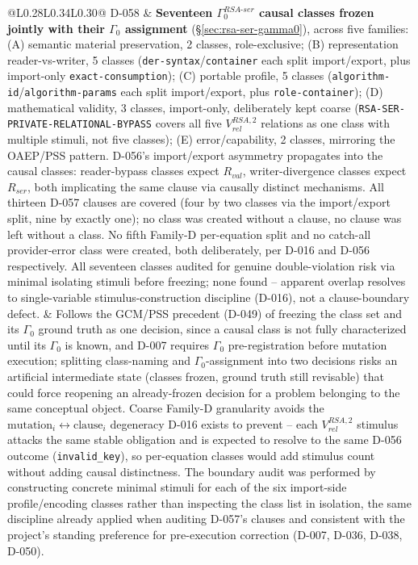 \documentclass[11pt,a4paper]{article}
\begin{document}
\begin{longtable}{@{}L{0.28\textwidth}L{0.34\textwidth}L{0.30\textwidth}@{}}
D-058 & \textbf{Seventeen $\Gamma_0^{RSA\text{-}ser}$ causal classes frozen jointly with their $\Gamma_0$ assignment} (\S\ref{sec:rsa-ser-gamma0}), across five families: (A) semantic material preservation, 2 classes, role-exclusive; (B) representation reader-vs-writer, 5 classes (\texttt{der-syntax}/\texttt{container} each split import/export, plus import-only \texttt{exact-consumption}); (C) portable profile, 5 classes (\texttt{algorithm-id}/\texttt{algorithm-params} each split import/export, plus \texttt{role-container}); (D) mathematical validity, 3 classes, import-only, deliberately kept coarse (\texttt{RSA-SER-PRIVATE-RELATIONAL-BYPASS} covers all five $V_{rel}^{RSA,2}$ relations as one class with multiple stimuli, not five classes); (E) error/capability, 2 classes, mirroring the OAEP/PSS pattern. D-056's import/export asymmetry propagates into the causal classes: reader-bypass classes expect $R_{val}$, writer-divergence classes expect $R_{ser}$, both implicating the same clause via causally distinct mechanisms. All thirteen D-057 clauses are covered (four by two classes via the import/export split, nine by exactly one); no class was created without a clause, no clause was left without a class. No fifth Family-D per-equation split and no catch-all provider-error class were created, both deliberately, per D-016 and D-056 respectively. All seventeen classes audited for genuine double-violation risk via minimal isolating stimuli before freezing; none found -- apparent overlap resolves to single-variable stimulus-construction discipline (D-016), not a clause-boundary defect. & Follows the GCM/PSS precedent (D-049) of freezing the class set and its $\Gamma_0$ ground truth as one decision, since a causal class is not fully characterized until its $\Gamma_0$ is known, and D-007 requires $\Gamma_0$ pre-registration before mutation execution; splitting class-naming and $\Gamma_0$-assignment into two decisions risks an artificial intermediate state (classes frozen, ground truth still revisable) that could force reopening an already-frozen decision for a problem belonging to the same conceptual object. Coarse Family-D granularity avoids the $\text{mutation}_i \leftrightarrow \text{clause}_i$ degeneracy D-016 exists to prevent -- each $V_{rel}^{RSA,2}$ stimulus attacks the same stable obligation and is expected to resolve to the same D-056 outcome (\texttt{invalid\_key}), so per-equation classes would add stimulus count without adding causal distinctness. The boundary audit was performed by constructing concrete minimal stimuli for each of the six import-side profile/encoding classes rather than inspecting the class list in isolation, the same discipline already applied when auditing D-057's clauses and consistent with the project's standing preference for pre-execution correction (D-007, D-036, D-038, D-050).\\

\end{longtable}
\end{document}
